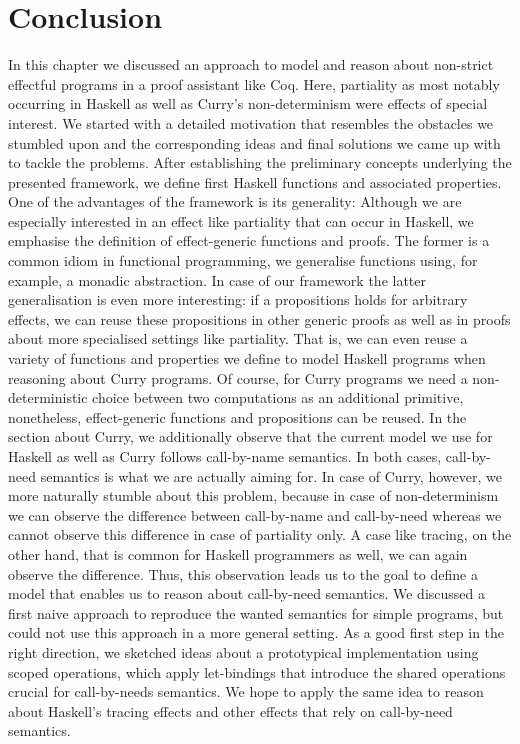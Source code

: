 \section{Conclusion}
\label{sec:conclusion}

In this chapter we discussed an approach to model and reason about
non-strict effectful programs in a proof assistant like Coq.
Here, partiality as most notably occurring in Haskell as well as
Curry's non-determinism were effects of special interest.
We started with a detailed motivation that resembles the obstacles we
stumbled upon and the corresponding ideas and final solutions we came
up with to tackle the problems.
After establishing the preliminary concepts underlying the presented
framework, we define first Haskell functions and associated properties.
One of the advantages of the framework is its generality: Although we
are especially interested in an effect like partiality that can occur
in Haskell, we emphasise the definition of effect-generic functions and
proofs.
The former is a common idiom in functional programming, we generalise
functions using, for example, a monadic abstraction.
In case of our framework the latter generalisation is even more
interesting: if a propositions holds for arbitrary effects, we can
reuse these propositions in other generic proofs as well as in proofs
about more specialised settings like partiality.
That is, we can even reuse a variety of functions and properties we
define to model Haskell programs when reasoning about Curry programs.
Of course, for Curry programs we need a non-deterministic choice
between two computations as an additional primitive, nonetheless,
effect-generic functions and propositions can be reused.
In the section about Curry, we additionally observe that the current
model we use for Haskell as well as Curry follows call-by-name
semantics.
In both cases, call-by-need semantics is what we are actually aiming
for.
In case of Curry, however, we more naturally stumble about this
problem, because in case of non-determinism we can observe the
difference between call-by-name and call-by-need whereas we cannot
observe this difference in case of partiality only.
A case like tracing, on the other hand, that is common for Haskell
programmers as well, we can again observe the difference.
Thus, this observation leads us to the goal to define a model that
enables us to reason about call-by-need semantics.
We discussed a first naive approach to reproduce the wanted semantics
for simple programs, but could not use this approach in a more general
setting.
As a good first step in the right direction, we sketched ideas about a
prototypical implementation using scoped operations, which apply
let-bindings that introduce the shared operations crucial for
call-by-needs semantics.
We hope to apply the same idea to reason about Haskell's tracing
effects and other effects that rely on call-by-need semantics.

